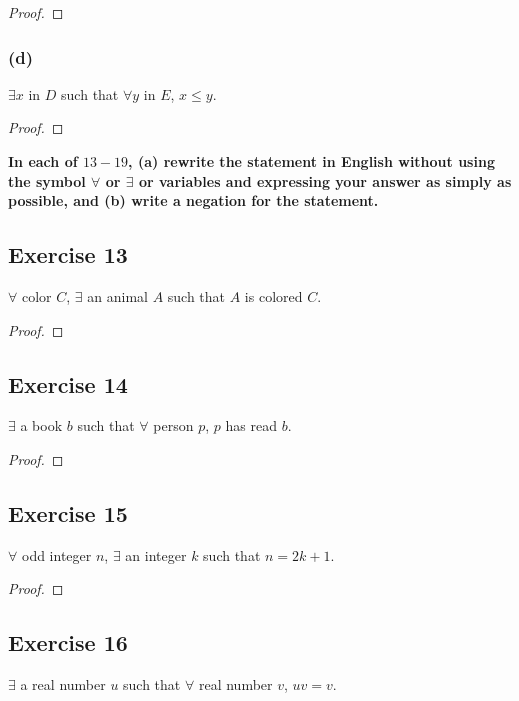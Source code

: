 \documentclass[14pt]{extarticle}
\newcommand{\fa}{\forall}
\newcommand{\te}{\exists}
\begin{document}
\begin{proof}

\end{proof}

\subsubsection{(d)}
$\te x$ in $D$ such that $\fa y$ in $E$, $x \leq y$.

\begin{proof}

\end{proof}

{\bf \color{cyan} In each of $13-19$, (a) rewrite the statement in English without using the symbol $\fa$ or $\te$ or variables and expressing your answer as simply as possible, and (b) write a negation for the statement.}

\subsection{Exercise 13}
$\fa$ color $C$, $\te$ an animal $A$ such that $A$ is colored $C$.

\begin{proof}

\end{proof}

\subsection{Exercise 14}
$\te$ a book $b$ such that $\fa$ person $p$, $p$ has read $b$.

\begin{proof}

\end{proof}

\subsection{Exercise 15}
$\fa$ odd integer $n$, $\te$ an integer $k$ such that $n = 2k + 1$.

\begin{proof}

\end{proof}

\subsection{Exercise 16}
$\te$ a real number $u$ such that $\fa$ real number $v$, $uv = v$.
\end{document}
